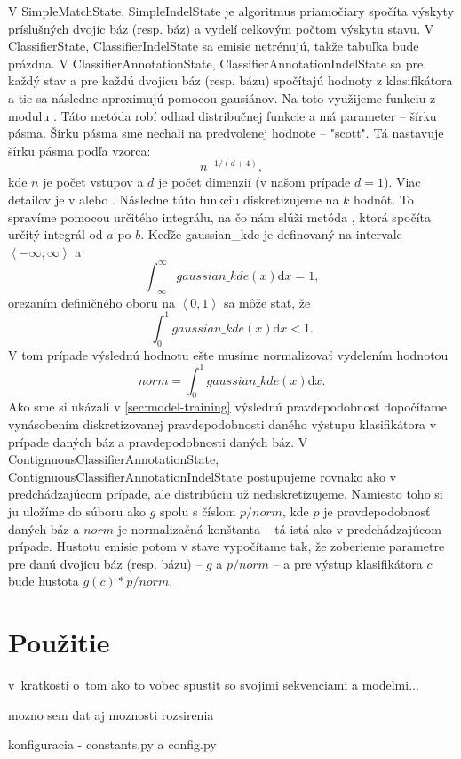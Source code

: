 V SimpleMatchState, SimpleIndelState je algoritmus priamočiary spočíta výskyty príslušných dvojíc báz (resp. báz) a vydelí celkovým počtom výskytu stavu.
V ClassifierState, ClassifierIndelState sa emisie netrénujú, takže tabuľka bude prázdna.
V ClassifierAnnotationState, ClassifierAnnotationIndelState sa pre každý stav a pre každú dvojicu báz (resp. bázu) spočítajú hodnoty z klasifikátora a tie sa následne aproximujú pomocou gausiánov. Na toto využijeme funkciu  z modulu . Táto metóda robí odhad distribučnej funkcie a má parameter -- šírku pásma. Šírku pásma sme nechali na predvolenej hodnote -- "scott". Tá nastavuje šírku pásma podľa vzorca:
$$n^{-1/(d+4)},$$
kde $n$ je počet vstupov a $d$ je počet dimenzií (v našom prípade $d = 1$). Viac detailov je v \cite{scipydoc} alebo \cite{wiki:kde}. Následne túto funkciu diskretizujeme na $k$ hodnôt. To spravíme pomocou určitého integrálu, na čo nám slúži metóda , ktorá spočíta určitý integrál od $a$ po $b$.
Keďže gaussian\_kde je definovaný na intervale $\left<-\infty, \infty \right>$ a $$\int_{-\infty}^\infty \! gaussian\_kde(x) \mathrm{d}x = 1,$$ orezaním definičného oboru na $\left<0,1\right>$ sa môže stať, že $$\int_0^1 \! gaussian\_kde(x) \mathrm{d}x < 1.$$ V tom prípade výslednú hodnotu ešte musíme normalizovať vydelením hodnotou $$norm = \int_0^1 \! gaussian\_kde(x) \mathrm{d}x.$$ Ako sme si ukázali v \ref{sec:model-training} výslednú pravdepodobnosť dopočítame vynásobením diskretizovanej pravdepodobnosti daného výstupu klasifikátora v prípade daných báz a pravdepodobnosti daných báz.
V ContignuousClassifierAnnotationState, ContignuousClassifierAnnotationIndelState postupujeme rovnako ako v predchádzajúcom prípade, ale distribúciu už nediskretizujeme. Namiesto toho si ju uložíme do súboru ako $g$ spolu s číslom $p/norm$, kde $p$ je pravdepodobnosť daných báz a $norm$ je normalizačná konštanta -- tá istá ako v predchádzajúcom prípade. Hustotu emisie potom v stave vypočítame tak, že zoberieme parametre pre danú dvojicu báz (resp. bázu) -- $g$ a $p/norm$ -- a pre výstup klasifikátora $c$ bude hustota $g(c)*p/norm.$

\section{Použitie}
\todo v~kratkosti o~tom ako to vobec spustit so svojimi sekvenciami a modelmi...

\todo mozno sem dat aj moznosti rozsirenia

\todo konfiguracia - constants.py a config.py
